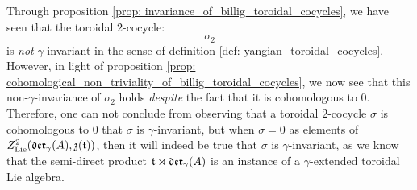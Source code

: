         \begin{remark}
            Through proposition \ref{prop: invariance_of_billig_toroidal_cocycles}, we have seen that the toroidal $2$-cocycle:
                $$\sigma_2$$
            is \textit{not} $\gamma$-invariant in the sense of definition \ref{def: yangian_toroidal_cocycles}. However, in light of proposition \ref{prop: cohomological_non_triviality_of_billig_toroidal_cocycles}, we now see that this non-$\gamma$-invariance of $\sigma_2$ holds \textit{despite} the fact that it is cohomologous to $0$. Therefore, one can not conclude from observing that a toroidal $2$-cocycle $\sigma$ is cohomologous to $0$ that $\sigma$ is $\gamma$-invariant, but when $\sigma = 0$ as elements of $Z^2_{\mathrm{Lie}}(\mathfrak{der}_{\gamma}(A), \mathfrak{z}(\mathfrak{t}))$, then it will indeed be true that $\sigma$ is $\gamma$-invariant, as we know that the semi-direct product $\mathfrak{t} \rtimes \mathfrak{der}_{\gamma}(A)$ is an instance of a $\gamma$-extended toroidal Lie algebra.
        \end{remark}